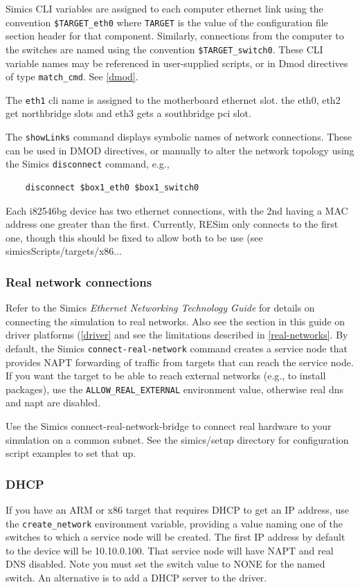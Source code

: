 \documentclass[titlepage]{article}
\begin{document}
Simics CLI variables are assigned to each computer ethernet link using the convention {\tt \$TARGET\_eth0} where {\tt TARGET}
is the value of the configuration file section header for that component.  Similarly, connections from the computer to the switches 
are named using the convention {\tt \$TARGET\_switch0}.  These CLI variable names may be referenced in user-supplied scripts, or in 
Dmod directives of type {\tt match\_cmd}.  See \ref{dmod}.

The {\tt eth1} cli name is assigned to the motherboard ethernet slot. the eth0, eth2 get northbridge slots and eth3 gets a southbridge pci slot.

The {\tt showLinks} command displays symbolic names of network connections.  These can be used in DMOD directives, or manually to alter
the network topology using the Simics {\tt disconnect} command, e.g., 
\begin{verbatim}
    disconnect $box1_eth0 $box1_switch0
\end{verbatim}

Each i82546bg device has two ethernet connections, with the 2nd having a MAC address one greater than the first.  Currently, RESim only connects to the first one,
though this should be fixed to allow both to be use (see simicsScripts/targets/x86...

\subsubsection{Real network connections}
Refer to the Simics \textit{Ethernet Networking Technology Guide} for details on connecting the simulation to real networks.
Also see the section in this guide on driver platforms (\ref{driver} and see the limitations described in \ref{real-networks}.  
By default, the Simics {\tt connect-real-network} command creates a service
node that provides NAPT forwarding of traffic from targets that can reach the service node.  If you want the target to be able to
reach external networks (e.g., to install packages), use the {\tt ALLOW\_REAL\_EXTERNAL} environment value, otherwise real dns and napt are disabled.

Use the Simics connect-real-network-bridge to connect real hardware to your simulation on a common subnet. See the simics/setup directory for 
configuration script examples to set that up.

\subsubsection{DHCP}
\label{DHCP}
If you have an ARM or x86 target that requires DHCP to get an IP address, use the {\tt create\_network} environment variable, providing a value
naming one of the switches to which a service node will be created.  The first IP address by default to the device will be 10.10.0.100.
That service node will have NAPT and real DNS disabled.  Note you must set the switch value to NONE for the named switch.  An alternative is to add
a DHCP server to the driver.
\end{document}

